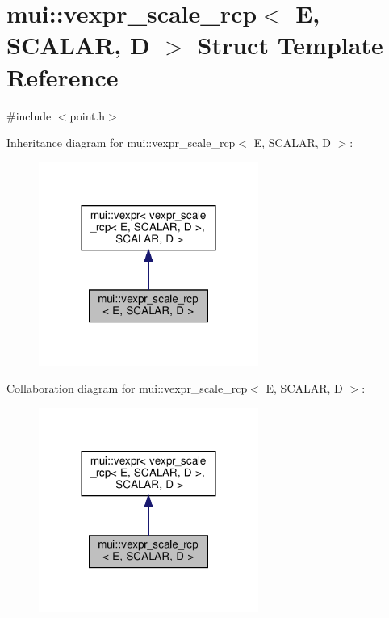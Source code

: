 \hypertarget{structmui_1_1vexpr__scale__rcp}{}\section{mui\+:\+:vexpr\+\_\+scale\+\_\+rcp$<$ E, S\+C\+A\+L\+AR, D $>$ Struct Template Reference}
\label{structmui_1_1vexpr__scale__rcp}


{\ttfamily \#include $<$point.\+h$>$}



Inheritance diagram for mui\+:\+:vexpr\+\_\+scale\+\_\+rcp$<$ E, S\+C\+A\+L\+AR, D $>$\+:
\nopagebreak
\begin{figure}[H]
\begin{center}
\leavevmode
\includegraphics[width=204pt]{structmui_1_1vexpr__scale__rcp__inherit__graph}
\end{center}
\end{figure}


Collaboration diagram for mui\+:\+:vexpr\+\_\+scale\+\_\+rcp$<$ E, S\+C\+A\+L\+AR, D $>$\+:
\nopagebreak
\begin{figure}[H]
\begin{center}
\leavevmode
\includegraphics[width=204pt]{structmui_1_1vexpr__scale__rcp__coll__graph}
\end{center}
\end{figure}
